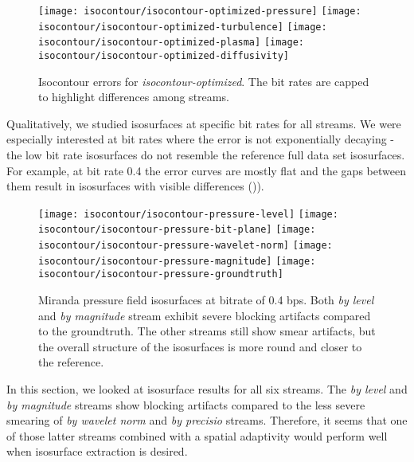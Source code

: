 \begin{figure}
	\centering
	{\texttt{[image: isocontour/isocontour-optimized-pressure]}}
	{\texttt{[image: isocontour/isocontour-optimized-turbulence]}}
	{\texttt{[image: isocontour/isocontour-optimized-plasma]}}
	{\texttt{[image: isocontour/isocontour-optimized-diffusivity]}}
	\caption{Isocontour errors for \emph{isocontour-optimized}. The bit rates are capped to highlight differences
	among streams.}
	\label{fig:isocontour-plots}
\end{figure}

Qualitatively, we studied isosurfaces at specific bit rates for all streams. We were especially interested
at bit rates where the error is not exponentially decaying - the low bit rate isosurfaces do not resemble
the reference full data set isosurfaces. For example, at bit rate 0.4 the error curves are mostly flat and the gaps between
them result in isosurfaces with visible differences ()).

\begin{figure}[h]
	\centering
	{\texttt{[image: isocontour/isocontour-pressure-level]}}
	{\texttt{[image: isocontour/isocontour-pressure-bit-plane]}}
	{\texttt{[image: isocontour/isocontour-pressure-wavelet-norm]}}
	{\texttt{[image: isocontour/isocontour-pressure-magnitude]}}
	{\texttt{[image: isocontour/isocontour-pressure-groundtruth]}}
	\caption{Miranda pressure field isosurfaces at bitrate of 0.4 bps. Both {\em by level}
        and {\em by magnitude} stream exhibit severe blocking artifacts compared to the groundtruth. The other streams
        still show smear artifacts, but the overall structure of the isosurfaces is more round and closer to the
        reference.}
	\label{fig:isocontour-surfaces}
\end{figure}




In this section, we looked at isosurface results for all six streams. The {\em by level} and {\em by magnitude} streams
show blocking artifacts compared to the less severe smearing of {\em by wavelet norm} and {\em by precisio} streams. Therefore,
it seems that one of those latter streams combined with a spatial adaptivity would perform well when isosurface
extraction is desired.
